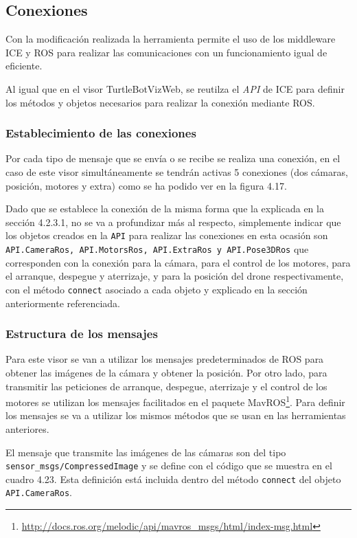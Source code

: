 \subsection{Conexiones}

Con la modificación realizada la herramienta permite el uso de los middleware ICE y ROS para realizar las comunicaciones con un funcionamiento igual de eficiente.

Al igual que en el visor TurtleBotVizWeb, se reutilza el \textit{API} de ICE para definir los métodos y objetos necesarios para realizar la conexión mediante ROS.

\subsubsection{Establecimiento de las conexiones}

Por cada tipo de mensaje que se envía o se recibe se realiza una conexión, en el caso de este visor simultáneamente se tendrán activas 5 conexiones (dos cámaras, posición, motores y extra) como se ha podido ver en la figura 4.17.

Dado que se establece la conexión de la misma forma que la explicada en la sección 4.2.3.1, no se va a profundizar más al respecto, simplemente indicar que los objetos creados en la \texttt{API} para realizar las conexiones en esta ocasión son \texttt{API.CameraRos, API.MotorsRos, API.ExtraRos y API.Pose3DRos} que corresponden con la conexión para la cámara, para el control de los motores, para el arranque, despegue y aterrizaje, y para la posición del drone respectivamente, con el método \texttt{connect} asociado a cada objeto y explicado en la sección anteriormente referenciada.

\subsubsection{Estructura de los mensajes}

Para este visor se van a utilizar los mensajes predeterminados de ROS para obtener las imágenes de la cámara y obtener la posición. Por otro lado, para transmitir las peticiones de arranque, despegue, aterrizaje y el control de los motores se utilizan los mensajes facilitados en el paquete MavROS\footnote{\url{http://docs.ros.org/melodic/api/mavros_msgs/html/index-msg.html}}. Para definir los mensajes se va a utilizar los mismos métodos que se usan en las herramientas anteriores.

El mensaje que transmite las imágenes de las cámaras son del tipo \texttt{sensor\_msgs/CompressedImage} y se define con el código que se muestra en el cuadro 4.23. Esta definición está incluida dentro del método \texttt{connect} del objeto \texttt{API.CameraRos}.

